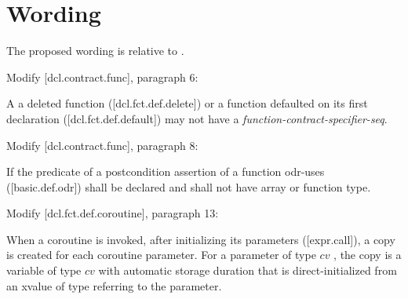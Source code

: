 \section{Wording}

The proposed wording is relative to \cite{P2900R8}.

Modify [dcl.contract.func], paragraph 6:
\begin{adjustwidth}{0.5cm}{0.5cm}
A a deleted function ([dcl.fct.def.delete])\removed{,} or a function defaulted on its first declaration ([dcl.fct.def.default]) may not have a \emph{function-contract-specifier-seq}.
\end{adjustwidth}

Modify [dcl.contract.func], paragraph 8:
\begin{adjustwidth}{0.5cm}{0.5cm}
If the predicate of a postcondition assertion of a function odr-uses ([basic.def.odr])  shall be declared  and shall not have array or function type.
\end{adjustwidth}

%
%
%
%

Modify [dcl.fct.def.coroutine], paragraph 13:
\begin{adjustwidth}{0.5cm}{0.5cm}
When a coroutine is invoked, after initializing its parameters ([expr.call]), a copy is created for each coroutine parameter. For a parameter of type $cv$ , the copy is a variable of type $cv$  with automatic storage duration that is direct-initialized from an xvalue of type  referring to the parameter.
\end{adjustwidth}

